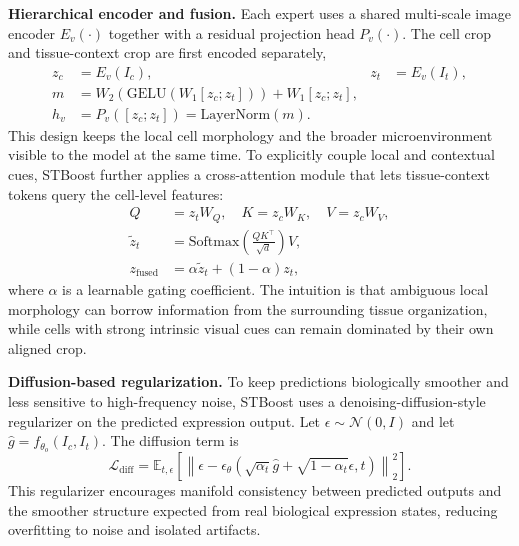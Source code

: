 \documentclass[sigconf,review]{acmart}
\begin{document}
\noindent\textbf{Hierarchical encoder and fusion.}
Each expert uses a shared multi-scale image encoder $E_v(\cdot)$ together with a residual projection head $P_v(\cdot)$. The cell crop and tissue-context crop are first encoded separately,
\begin{align}
z_c &= E_v(I_c), & z_t &= E_v(I_t), \\
m &= W_2(\mathrm{GELU}(W_1[z_c; z_t])) + W_1[z_c; z_t], \\
h_v &= P_v([z_c; z_t]) = \mathrm{LayerNorm}(m).
\end{align}
This design keeps the local cell morphology and the broader microenvironment visible to the model at the same time. To explicitly couple local and contextual cues, STBoost further applies a cross-attention module that lets tissue-context tokens query the cell-level features:
\begin{equation}
\begin{aligned}
Q &= z_t W_Q, \quad K = z_c W_K, \quad V = z_c W_V, \\
\tilde{z}_t &= \mathrm{Softmax}\!\left(\frac{QK^\top}{\sqrt{d}}\right)V, \\
z_{\mathrm{fused}} &= \alpha \tilde{z}_t + (1-\alpha) z_t,
\end{aligned}
\end{equation}
where $\alpha$ is a learnable gating coefficient. The intuition is that ambiguous local morphology can borrow information from the surrounding tissue organization, while cells with strong intrinsic visual cues can remain dominated by their own aligned crop.

\noindent\textbf{Diffusion-based regularization.}
To keep predictions biologically smoother and less sensitive to high-frequency noise, STBoost uses a denoising-diffusion-style regularizer on the predicted expression output. Let $\epsilon\sim\mathcal{N}(0,I)$ and let $\hat{g}=f_{\theta_o}(I_c,I_t)$. The diffusion term is
\begin{equation}
\mathcal{L}_{\mathrm{diff}} =
\mathbb{E}_{t,\epsilon}\!
\left[
\left\lVert
\epsilon - \epsilon_\theta\!\left(\sqrt{\alpha_t}\hat{g}+\sqrt{1-\alpha_t}\epsilon,t\right)
\right\rVert_2^2
\right].
\end{equation}
This regularizer encourages manifold consistency between predicted outputs and the smoother structure expected from real biological expression states, reducing overfitting to noise and isolated artifacts.
\end{document}
